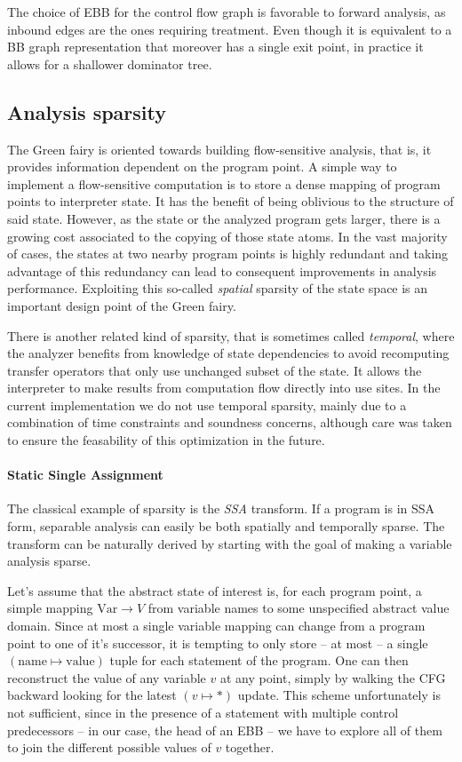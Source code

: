 \documentclass[14pt]{article}
\begin{document}
The choice of EBB for the control flow graph is favorable to forward analysis, as inbound edges are the ones requiring treatment. Even though it is equivalent to a BB graph representation that moreover has a single exit point, in practice it allows for a shallower dominator tree.

\subsection*{Analysis sparsity}

The Green fairy is oriented towards building flow-sensitive analysis, that is, it provides information dependent on the program point.
A simple way to implement a flow-sensitive computation is to store a dense mapping of program points to interpreter state. It has the benefit of being oblivious to the structure of said state.
However, as the state or the analyzed program gets larger, there is a growing cost associated to the copying of those state atoms.
In the vast majority of cases, the states at two nearby program points is highly redundant and taking advantage of this redundancy can lead to consequent improvements in analysis performance. Exploiting this so-called \emph{spatial} sparsity of the state space is an important design point of the Green fairy.

There is another related kind of sparsity, that is sometimes called \emph{temporal}, where the analyzer benefits from knowledge of state dependencies to avoid recomputing transfer operators that only use unchanged subset of the state. It allows the interpreter to make results from computation flow directly into use sites. In the current implementation we do not use temporal sparsity, mainly due to a combination of time constraints and soundness concerns, although care was taken to ensure the feasability of this optimization in the future.

\paragraph{Static Single Assignment} The classical example of sparsity is the \emph{SSA} transform. If a program is in SSA form, separable analysis can easily be both spatially and temporally sparse. The transform can be naturally derived by starting with the goal of making a variable analysis sparse.

Let's assume that the abstract state of interest is, for each program point, a simple mapping $\text{Var}\to V$ from variable names to some unspecified abstract value domain. Since at most a single variable mapping can change from a program point to one of it's successor, it is tempting to only store -- at most -- a single $(\text{name}\mapsto\text{value})$ tuple for each statement of the program. One can then reconstruct the value of any variable $v$ at any point, simply by walking the CFG backward looking for the latest $(v\mapsto *)$ update. This scheme unfortunately is not sufficient, since in the presence of a statement with multiple control predecessors -- in our case, the head of an EBB -- we have to explore all of them to join the different possible values of $v$ together.
\end{document}
